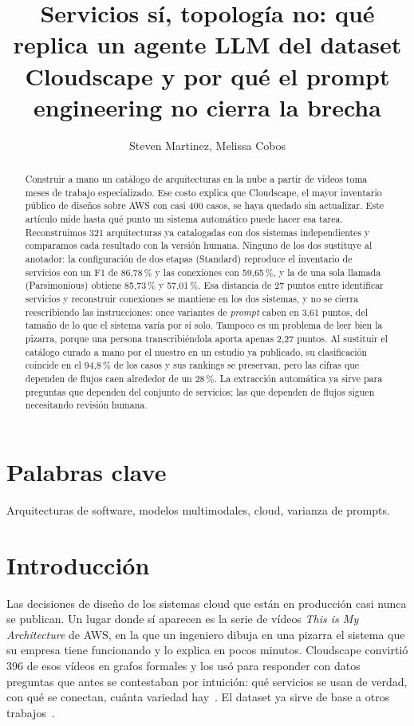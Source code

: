 \documentclass[a4paper, twocolumn, 10pt]{IEEEtran}
\title{Servicios sí, topología no: qué replica un agente LLM del dataset Cloudscape y por qué el prompt engineering no cierra la brecha}
\author{Steven Martinez, Melissa Cobos}
\begin{document}
\maketitle
 
\begin{abstract}
Construir a mano un catálogo de arquitecturas en la nube a partir de videos toma
meses de trabajo especializado. Ese costo explica que Cloudscape, el mayor
inventario público de diseños sobre AWS con casi 400 casos, se haya quedado sin
actualizar. Este artículo mide hasta qué punto un sistema automático puede hacer
esa tarea. Reconstruimos 321 arquitecturas ya catalogadas con dos sistemas
independientes y comparamos cada resultado con la versión humana. Ninguno de los
dos sustituye al anotador: la configuración de dos etapas (Standard) reproduce el
inventario de servicios con un F1 de 86,78\,\% y las conexiones con 59,65\,\%, y
la de una sola llamada (Parsimonious) obtiene 85,73\,\% y 57,01\,\%. Esa distancia
de 27 puntos entre identificar servicios y reconstruir conexiones se mantiene en
los dos sistemas, y no se cierra reescribiendo las instrucciones: once variantes
de \emph{prompt} caben en 3,61 puntos, del tamaño de lo que el sistema varía por
sí solo. Tampoco es un problema de leer bien la pizarra, porque una persona
transcribiéndola aporta apenas 2,27 puntos. Al sustituir el catálogo curado a
mano por el nuestro en un estudio ya publicado, su clasificación coincide en el
94,8\,\% de los casos y sus rankings se preservan, pero las cifras que dependen de
flujos caen alrededor de un 28\,\%. La extracción automática ya sirve para
preguntas que dependen del conjunto de servicios; las que dependen de flujos
siguen necesitando revisión humana.
\end{abstract}
 
\section*{Palabras clave}
Arquitecturas de software, modelos multimodales, cloud, varianza de prompts.
 
 
 
\section{Introducción}
 
Las decisiones de diseño de los sistemas cloud que están en producción casi nunca
se publican. Un lugar donde sí aparecen es la serie de vídeos \emph{This is My
Architecture} de AWS, en la que un ingeniero dibuja en una pizarra el sistema que
su empresa tiene funcionando y lo explica en pocos minutos. Cloudscape convirtió
396 de esos vídeos en grafos formales y los usó para responder con datos
preguntas que antes se contestaban por intuición: qué servicios se usan de
verdad, con qué se conectan, cuánta variedad hay~\cite{satija2025cloudscape}. El
dataset ya sirve de base a otros trabajos~\cite{santillan2025hpc}.
 
\end{document}
